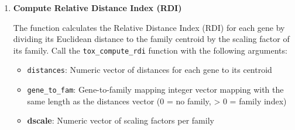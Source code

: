 \documentclass[11pt]{article}
\begin{document}
\begin{enumerate}
\begin{enumerate}
\begin{itemize}
	      	      	\item \textbf{indices\_used}: Integer vector of indices of families that
	      	      	      have been included in the calculation
	      	      	      
	      	      	\item \textbf{perm\_tmp}: Permutation vector for sorting
	      	      	      
	      	      	\item \textbf{stack\_left\_tmp}: Stack vector for sorting
	      	      	      
	      	      	\item \textbf{stack\_right\_tmp}: Stack vector for sorting
	      	      	      
	      	      	\item \textbf{family\_distances}: Work vector for sorting
	      	      \end{itemize}
	      	      \begin{lstlisting}[language=R, caption={R Compute Family Scaling (Expert Version)}]
tox_compute_family_scaling_expert(distances, gene_to_fam, n_families, 
    perm_tmp, stack_left_tmp, stack_right_tmp, family_distances)
	      	      \end{lstlisting}
	      	      
	      	\item \textbf{Compute Relative Distance Index (RDI)}
	      	      
	      	      The function calculates the Relative Distance Index (RDI) for each gene
	      	      by dividing its Euclidean distance to the family centroid by the scaling
	      	      factor of its family. Call the \texttt{tox\_compute\_rdi} function with
	      	      the following arguments:
	      	      
	      	      \begin{itemize}
	      	      	\item \texttt{distances}: Numeric vector of distances for each gene to
	      	      	      its centroid
	      	      	      
	      	      	\item \texttt{gene\_to\_fam}: Gene-to-family mapping integer vector mapping
	      	      	      with the same length as the distances vector (0 = no family, \textgreater
	      	      	      0 = family index)
	      	      	      
	      	      	\item \textbf{dscale}: Numeric vector of scaling factors per family
	      	      \end{itemize}
	      	      

\end{enumerate}
\end{enumerate}
\end{document}
